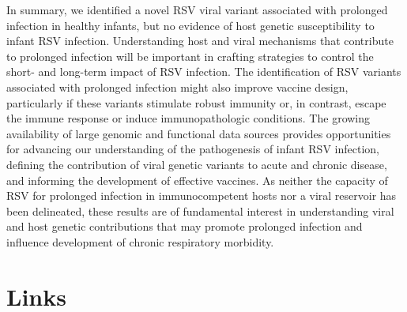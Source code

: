 \documentclass{article} %
\begin{document}
In summary, we identified a novel RSV viral variant associated with prolonged infection in healthy infants, but no evidence of host genetic susceptibility to infant RSV infection. Understanding host and viral mechanisms that contribute to prolonged infection will be important in crafting strategies to control the short- and long-term impact of RSV infection. The identification of RSV variants associated with prolonged infection might also improve vaccine design, particularly if these variants stimulate robust immunity or, in contrast, escape the immune response or induce immunopathologic conditions. The growing availability of large genomic and functional data sources provides opportunities for advancing our understanding of the pathogenesis of infant RSV infection, defining the contribution of viral genetic variants to acute and chronic disease, and informing the development of effective vaccines. As neither the capacity of RSV for prolonged infection in immunocompetent hosts nor a viral reservoir has been delineated, these results are of fundamental interest in understanding viral and host genetic contributions that may promote prolonged infection and influence development of chronic respiratory morbidity. 

\section{Links}
\end{document}
